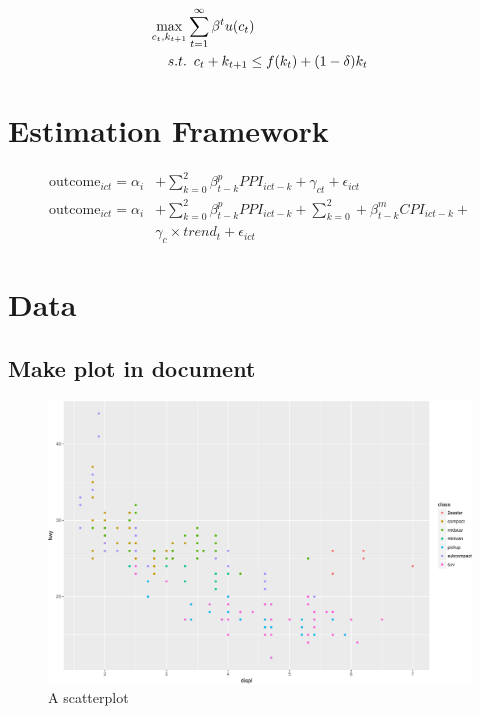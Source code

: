\documentclass[12pt,]{article}
\newcommand{\maximise}{\operatornamewithlimits{max}}
\begin{document}
\begin{align*}
\maximise_{c_t,k_{t+1}} &  \sum_{t=1}^{\infty} \beta^t u(c_t)  \\
  s.t. & \enspace c_{t} + k_{t+1} \leq f(k_t) + (1-\delta)k_t
\end{align*}

\hypertarget{estimation-framework}{%
\section{Estimation Framework}\label{estimation-framework}}

\begin{align*}
\text{outcome}_{ict} = \alpha_i & + \sum_{k=0}^2 \beta_{t-k}^p
PPI_{ict-k} + \gamma_{ct} + \epsilon_{ict} \\
\text{outcome}_{ict} = \alpha_i & + \sum_{k=0}^2 \beta_{t-k}^p PPI_{ict-k} +
\sum_{k=0}^2 + \beta_{t-k}^m CPI_{ict-k} + \\ & \gamma_{c}\times
trend_t + \epsilon_{ict}
\end{align*}

\hypertarget{data}{%
\section{Data}\label{data}}

\hypertarget{make-plot-in-document}{%
\subsection{Make plot in document}\label{make-plot-in-document}}

\begin{figure}
\centering
\includegraphics{Figs/unnamed-chunk-2-1.pdf}
\caption{A scatterplot}
\end{figure}
\end{document}
